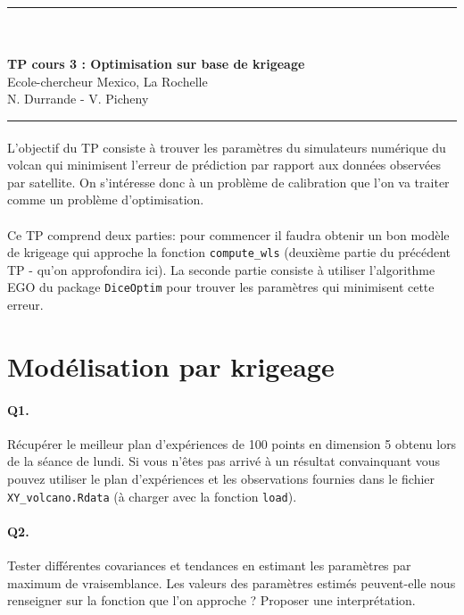 \documentclass[12pt]{scrartcl}
\begin{document}
\begin{center}
	\rule{\textwidth}{1pt}
	\\ \ \\
	{\LARGE \textbf{TP cours 3 : Optimisation sur base de krigeage}}\\
	\vspace{3mm}
	{\large Ecole-chercheur Mexico, La Rochelle \\ \vspace{3mm}}
	{\normalsize N. Durrande - V. Picheny}\\
	\vspace{3mm}
	\rule{\textwidth}{1pt}
	\vspace{5mm}
\end{center}
\paragraph{}
L'objectif du TP consiste à trouver les paramètres du simulateurs numérique du volcan qui minimisent l'erreur de prédiction par rapport aux données observées par satellite. On s'intéresse donc à un problème de calibration que l'on va traiter comme un problème d'optimisation.
\paragraph{}
Ce TP comprend deux parties: pour commencer il faudra obtenir un bon modèle de krigeage qui approche la fonction \texttt{compute\_wls} (deuxième partie du précédent TP - qu'on approfondira ici). 
La seconde partie consiste à utiliser l'algorithme EGO du package \texttt{DiceOptim} pour trouver les paramètres qui minimisent cette erreur.

\section{Modélisation par krigeage}

\paragraph{Q1.} Récupérer le meilleur plan d'expériences de 100 points en dimension 5 obtenu lors de la séance de lundi. 
Si vous n'êtes pas arrivé à un résultat convainquant vous pouvez utiliser le plan d'expériences et les observations fournies dans le fichier \texttt{XY\_volcano.Rdata} (à charger avec la fonction \texttt{load}).

\paragraph{Q2.} Tester différentes covariances et tendances en estimant les paramètres par maximum de vraisemblance. Les valeurs des paramètres estimés peuvent-elle nous renseigner sur la fonction que l'on approche ? Proposer une interprétation.
\end{document}
